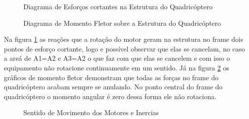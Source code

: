 \begin{figure}[H]
	\centering
	\caption{Diagrama de Esforços cortantes na Estrutura do Quadricóptero}
	\fontsize{9pt}{12pt}\selectfont
	\def\svgwidth{13cm}
	
	\label{fig:esfcort}
\end{figure}


\begin{figure}[H]
	\centering
	\caption{Diagrama de Momento Fletor sobre a Estrutura do Quadricóptero}
	\fontsize{9pt}{12pt}\selectfont
	\def\svgwidth{13cm}
	
	\label{fig:momflet}
\end{figure}

Na figura \ref{fig:esfcort} as reações que a rotação do motor geram na estrutura no frame dois pontos de esforço cortante, logo e possível observar que elas se cancelam, no caso a areá de  A1=A2 e A3=A2 o que faz com que elas se cancelem e com isso o equipamento não rotacione continuamente em um sentido. Já na figura \ref{fig:momflet} os gráficos de momento fletor demonstram que todas as forças no frame do quadricóptero acabam sempre se anulando. No ponto central do frame do quadricóptero o momento angular é zero dessa forma ele não rotaciona\cite{momesf}. 

\begin{figure}[htpb]
	\centering
	\caption{Sentido de Movimento dos Motores e Inercias}
	\fontsize{11pt}{14pt}\selectfont
	\def\svgwidth{13cm}
	
	\label{fig:rotationmot}
\end{figure}

